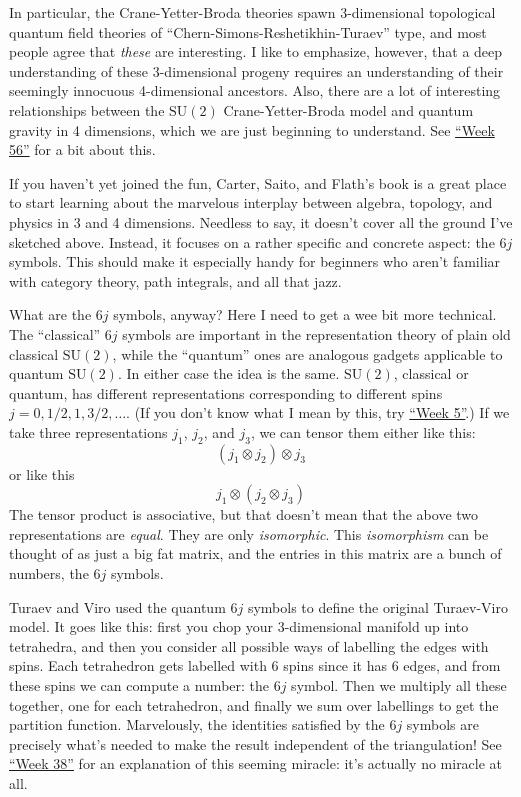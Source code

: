 \documentclass{article}
\begin{document}
In particular, the Crane-Yetter-Broda theories spawn 3-dimensional
topological quantum field theories of
``Chern-Simons-Reshetikhin-Turaev'' type, and most people agree that
\emph{these} are interesting. I like to emphasize, however, that a deep
understanding of these 3-dimensional progeny requires an understanding
of their seemingly innocuous 4-dimensional ancestors. Also, there are a
lot of interesting relationships between the \(\mathrm{SU}(2)\)
Crane-Yetter-Broda model and quantum gravity in 4 dimensions, which we
are just beginning to understand. See \protect\hyperlink{week56}{``Week
56''} for a bit about this.

If you haven't yet joined the fun, Carter, Saito, and Flath's book is a
great place to start learning about the marvelous interplay between
algebra, topology, and physics in 3 and 4 dimensions. Needless to say,
it doesn't cover all the ground I've sketched above. Instead, it focuses
on a rather specific and concrete aspect: the \(6j\) symbols. This
should make it especially handy for beginners who aren't familiar with
category theory, path integrals, and all that jazz.

What are the \(6j\) symbols, anyway? Here I need to get a wee bit more
technical. The ``classical'' \(6j\) symbols are important in the
representation theory of plain old classical \(\mathrm{SU}(2)\), while
the ``quantum'' ones are analogous gadgets applicable to quantum
\(\mathrm{SU}(2)\). In either case the idea is the same.
\(\mathrm{SU}(2)\), classical or quantum, has different representations
corresponding to different spins \(j = 0, 1/2, 1, 3/2,\ldots\). (If you
don't know what I mean by this, try \protect\hyperlink{week5}{``Week
5''}.) If we take three representations \(j_1\), \(j_2\), and \(j_3\),
we can tensor them either like this: \[(j_1\otimes j_2)\otimes j_3\] or
like this \[j_1\otimes (j_2\otimes j_3)\] The tensor product is
associative, but that doesn't mean that the above two representations
are \emph{equal}. They are only \emph{isomorphic}. This
\emph{isomorphism} can be thought of as just a big fat matrix, and the
entries in this matrix are a bunch of numbers, the \(6j\) symbols.

Turaev and Viro used the quantum \(6j\) symbols to define the original
Turaev-Viro model. It goes like this: first you chop your 3-dimensional
manifold up into tetrahedra, and then you consider all possible ways of
labelling the edges with spins. Each tetrahedron gets labelled with 6
spins since it has 6 edges, and from these spins we can compute a
number: the \(6j\) symbol. Then we multiply all these together, one for
each tetrahedron, and finally we sum over labellings to get the
partition function. Marvelously, the identities satisfied by the \(6j\)
symbols are precisely what's needed to make the result independent of
the triangulation! See \protect\hyperlink{week38}{``Week 38''} for an
explanation of this seeming miracle: it's actually no miracle at all.
\end{document}
